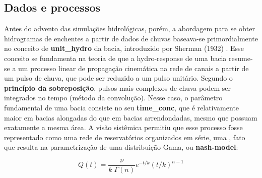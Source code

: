 \documentclass[./main.tex]{subfiles}
\begin{document}
\subsection{Dados e processos} \label{sec:hydro:databased}

\par Antes do advento das simulações hidrológicas, porém, a abordagem para se obter hidrogramas de enchentes a partir de dados de chuvas baseava-se primordialmente no conceito de \textbf{\gls{unit_hydro}} da bacia, introduzido por Sherman (1932) \cite{Sherman1932a}. Esse conceito se fundamenta na \gls{teoria} de que a \gls{hydro-response} de uma bacia resume-se a um processo linear de propagação cinemática na rede de canais a partir de um pulso de chuva, que pode ser reduzido a um pulso unitário. Segundo o \textbf{princípio da sobreposição}, pulsos mais complexos de chuva podem ser integrados no tempo (método da convolução). Nesse caso, o parâmetro fundamental de uma bacia consiste no seu \textbf{\gls{time_conc}}, que é relativamente maior em bacias alongadas do que em bacias arrendondadas, mesmo que possuam exatamente a mesma área. A visão sistêmica permitiu que esse processo fosse representado como uma rede de reservatórios organizados em série, uma , fato que resulta na parametrização de uma distribuição Gama, ou \textbf{\gls{nash-model}}:
\begin{linenomath*}
\begin{equation}
\label{eq:kalinin}
Q(t) = \frac{\nu}{k\; \Gamma(n)} e^{-t/k} (t/k )^{n-1}
\end{equation}
\end{linenomath*}
\end{document}
